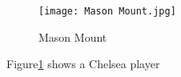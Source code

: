 \documentclass{article}
\begin{document}
	\begin{figure}
		\texttt{[image: Mason Mount.jpg]}
		\caption{Mason Mount}
		\label{fig:Mount}
	\end{figure}
   Figure\ref{fig:Mount} shows a Chelsea player
\end{document}
